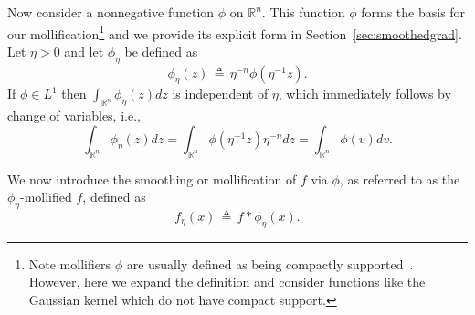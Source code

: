 \documentclass[11pt,reqno]{amsart}
\newcommand{\1}{{\bf 1}}
\newcommand{\2}{{\bf 2}}
\newcommand{\hb}[1]{\color{blue}{#1}}
\newcommand{\pc}[1]{{\color{cyan}#1}}
\newcommand{\us}[1]{\textcolor{red}{#1}}
\numberwithin{equation}{section}
\newtheorem{proposition}{Proposition}[section]
\theoremstyle{remark}
\begin{document}
		Now consider a nonnegative function $\phi$ on $\mathbb{R}^n$. This function $\phi$ forms the basis for our mollification\footnote{Note mollifiers $\phi$ are usually defined as being compactly supported~\cite{ermoliev1995minimization}. %
			However, here we expand the definition and consider functions like the Gaussian kernel which do not have compact support.}
		and {we} provide its explicit form in {Section~\ref{sec:smoothedgrad}}. Let $\eta>0$ and let $\phi_{\eta}$ be defined as
		\begin{equation}\label{eq:phieta}
			\phi_{\eta}(z) \, \triangleq \, \eta^{-n} \phi\left(\eta^{-1} z\right). 
		\end{equation}
		If $\phi \in L^1$  then $ \int_{\mathbb{R}^n} \phi_\eta(z) dz $ is independent of $ \eta$, which immediately follows by change of variables, i.e., 
		\begin{equation}\label{eq:intphi}
			\int_{\mathbb{R}^n} \phi_\eta(z) dz=\int_{\mathbb{R}^n} \phi\left(\eta^{-1} z\right) \eta^{-n} d z=\int_{\mathbb{R}^n} \phi(v) d v .
		\end{equation}

		We now introduce the smoothing or mollification of $f$ via $\phi$, as referred to as the $\phi_\eta$-mollified $f$, defined as 
		\begin{equation}\label{eq:feta}
			f_\eta(x) \, \triangleq \, f*\phi_\eta(x).
		\end{equation} 
\end{document}

